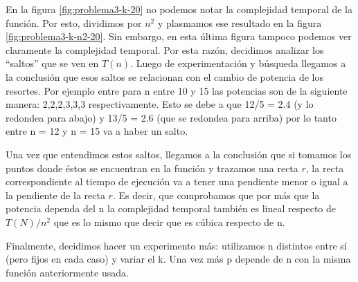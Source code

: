 En la figura \ref{fig:problema3-k-20} no podemos notar la complejidad temporal de la función. Por esto, dividimos por $n^2$ y plasmamos ese resultado en la figura \ref{fig:problema3-k-n2-20}. Sin embargo, en esta última figura tampoco podemos ver claramente la complejidad temporal. Por esta razón, decidimos analizar los ``saltos'' que se ven en $T(n)$. Luego de experimentación y búsqueda llegamos a la conclusión que esos saltos se relacionan con el cambio de potencia de los resortes. Por ejemplo entre para n entre 10 y 15 las potencias son de la siguiente manera: 2,2,2,3,3,3 respectivamente. Esto se debe a que 12/5 = 2.4 (y lo redondea para abajo) y 13/5 = 2.6 (que se redondea para arriba) por lo tanto entre n = 12 y n = 15 va a haber un salto.

Una vez que entendimos estos saltos, llegamos a la conclusión que si tomamos los puntos donde éstos se encuentran en la función y trazamos una recta $r$, la recta correspondiente al tiempo de ejecución va a tener una pendiente menor o igual a la pendiente de la recta $r$. Es decir, que comprobamos que por más que la potencia dependa del n la complejidad temporal también es lineal respecto de $T(N)/n^2$ que es lo mismo que decir que es cúbica respecto de n.

Finalmente, decidimos hacer un experimento más: utilizamos n distintos entre sí (pero fijos en cada caso) y variar el k. Una vez más p depende de n con la misma función anteriormente usada.

